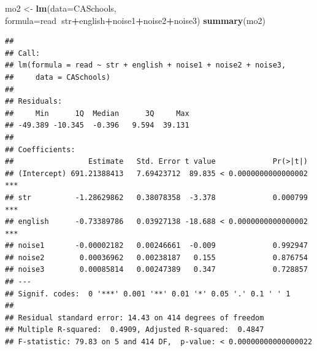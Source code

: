 \documentclass[
]{book}
\newenvironment{Shaded}{\begin{snugshade}}{\end{snugshade}}
\newcommand{\DataTypeTok}[1]{\textcolor[rgb]{0.13,0.29,0.53}{#1}}
\newcommand{\DecValTok}[1]{\textcolor[rgb]{0.00,0.00,0.81}{#1}}
\newcommand{\KeywordTok}[1]{\textcolor[rgb]{0.13,0.29,0.53}{\textbf{#1}}}
\newcommand{\NormalTok}[1]{#1}
\newcommand{\OperatorTok}[1]{\textcolor[rgb]{0.81,0.36,0.00}{\textbf{#1}}}
\newcommand{\StringTok}[1]{\textcolor[rgb]{0.31,0.60,0.02}{#1}}
\begin{document}
\begin{Shaded}
\begin{Highlighting}[]
\NormalTok{mo2 <-}\StringTok{ }\KeywordTok{lm}\NormalTok{(}\DataTypeTok{data=}\NormalTok{CASchools, }\DataTypeTok{formula=}\NormalTok{read}\OperatorTok{~}\NormalTok{str}\OperatorTok{+}\NormalTok{english}\OperatorTok{+}\NormalTok{noise1}\OperatorTok{+}\NormalTok{noise2}\OperatorTok{+}\NormalTok{noise3)}
\KeywordTok{summary}\NormalTok{(mo2)}
\end{Highlighting}
\end{Shaded}

\begin{verbatim}
## 
## Call:
## lm(formula = read ~ str + english + noise1 + noise2 + noise3, 
##     data = CASchools)
## 
## Residuals:
##     Min      1Q  Median      3Q     Max 
## -49.389 -10.345  -0.396   9.594  39.131 
## 
## Coefficients:
##                 Estimate   Std. Error t value             Pr(>|t|)    
## (Intercept) 691.21388413   7.69423712  89.835 < 0.0000000000000002 ***
## str          -1.28629862   0.38078358  -3.378             0.000799 ***
## english      -0.73389786   0.03927138 -18.688 < 0.0000000000000002 ***
## noise1       -0.00002182   0.00246661  -0.009             0.992947    
## noise2        0.00036962   0.00238187   0.155             0.876754    
## noise3        0.00085814   0.00247389   0.347             0.728857    
## ---
## Signif. codes:  0 '***' 0.001 '**' 0.01 '*' 0.05 '.' 0.1 ' ' 1
## 
## Residual standard error: 14.43 on 414 degrees of freedom
## Multiple R-squared:  0.4909, Adjusted R-squared:  0.4847 
## F-statistic: 79.83 on 5 and 414 DF,  p-value: < 0.00000000000000022
\end{verbatim}

\begin{Shaded}
\end{Shaded}
\end{document}

